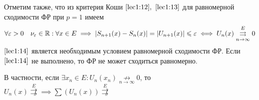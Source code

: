 \documentclass[../../main.tex]{subfiles}
\begin{document}
Отметим также, что из критерия Коши $\eqref{lec1:12},\ \eqref{lec1:13}$ 
для равномерной сходимости ФР при $p=1$ имеем
\begin{equation}
\label{lec1:14}
\forall \varepsilon > 0 \quad
\nu_\varepsilon \in \mathbb{R} : \forall x \in E \implies
|S_{n+1}(x) - S_n(x)| = |U_{n+1}(x)| \leqslant \varepsilon \iff
U_n(x) \overset{E}
{\underset{n \to \infty}\rightrightarrows} 0
\end{equation} 
$\eqref{lec1:14}$ является необходимым условием равномерной сходимости ФР.
Если $\eqref{lec1:14}$ не выполнено, то ФР не может сходиться равномерно.

В частности, если 
$\exists x_n \in E : U_n(x_n) \underset{n \to \infty}{\not \rightarrow} 0$, то
$U_n(x) \overset{E}{\not \rightrightarrows} \implies
\sum (U_n(x)) \overset{E}{\not \rightrightarrows}$
\end{document}
